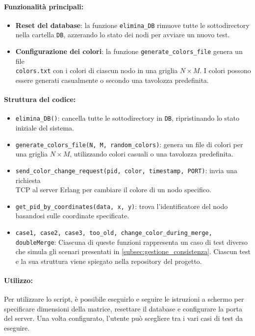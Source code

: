 \documentclass[12pt, a4paper]{report}
\begin{document}
\paragraph{Funzionalit\`a principali:}
\begin{itemize}
    \item \textbf{Reset del database}: la funzione \texttt{elimina\_DB} rimuove tutte le sottodirectory nella cartella \texttt{DB}, azzerando lo stato dei nodi per avviare un nuovo test.
    \item \textbf{Configurazione dei colori}: la funzione \texttt{generate\_colors\_file} genera un file \\
    \texttt{colors.txt} con i colori di ciascun nodo in una griglia $N \times M$. I colori possono essere generati casualmente o secondo una tavolozza predefinita.
\end{itemize}

\paragraph{Struttura del codice:}
\begin{itemize}
    \item \texttt{elimina\_DB()}: cancella tutte le sottodirectory in \texttt{DB}, ripristinando lo stato iniziale del sistema.
    \item \texttt{generate\_colors\_file(N, M, random\_colors)}: genera un file di colori per una griglia $N \times M$, utilizzando colori casuali o una tavolozza predefinita.
    \item \texttt{send\_color\_change\_request(pid, color, timestamp, PORT)}: invia una richiesta \\TCP al server Erlang per cambiare il colore di un nodo specifico.
    \item \texttt{get\_pid\_by\_coordinates(data, x, y)}: trova l’identificatore del nodo basandosi sulle coordinate specificate.
    \item \texttt{case1, case2, case3, too\_old, change\_color\_during\_merge, doubleMerge}: Ciascuna di queste funzioni rappresenta un caso di test diverso che simula gli scenari presentati in \ref{subsec:gestione_consistenza}. Ciascun test e la sua struttura viene spiegato nella repository del progetto.
\end{itemize}


\paragraph{Utilizzo:}
Per utilizzare lo script, \`e possibile eseguirlo e seguire le istruzioni a schermo per specificare dimensioni della matrice, resettare il database e configurare la porta del server.
Una volta configurato, l’utente può scegliere tra i vari casi di test da eseguire.
\end{document}
